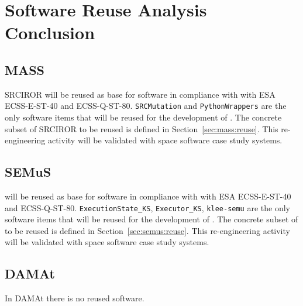 
\chapter{Software Reuse Analysis Conclusion}

\section{MASS}

SRCIROR will be reused as base for \MASS software in compliance with with ESA ECSS-E-ST-40 and ECSS-Q-ST-80.
\texttt{SRCMutation} and \texttt{PythonWrappers} are the only software items that will be reused for the development of \MASS.
The concrete subset of SRCIROR to be reused is defined in Section~\ref{sec:mass:reuse}.
This re-engineering activity will be validated with space software case study systems.

\section{SEMuS}

\SEMU will be reused as base for \SEMUS software in compliance with with ESA ECSS-E-ST-40 and ECSS-Q-ST-80.
\texttt{ExecutionState\_KS}, \texttt{Executor\_KS}, \texttt{klee-semu} are the only software items that will be reused for the development of \SEMUS.
The concrete subset of \SEMU to be reused is defined in Section~\ref{sec:semus:reuse}.
This re-engineering activity will be validated with space software case study systems.


\section{DAMAt}
\label{sec:damat:reuse}

In DAMAt there is no reused software.